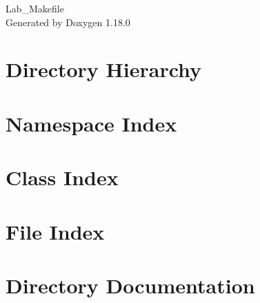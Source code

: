 \documentclass[twoside]{book}
\newcommand{\+}{\discretionary{\mbox{\scriptsize$\hookleftarrow$}}{}{}}
\newcommand{\clearemptydoublepage}{%
    \newpage{\pagestyle{empty}\cleardoublepage}%
  }
\begin{document}
  \raggedbottom
    \hypersetup{pageanchor=false,
                bookmarksnumbered=true,
                pdfencoding=unicode
               }
  \begin{titlepage}
  \vspace*{7cm}
  \begin{center}%
  {\Large Lab\+\_\+\+Makefile}\\
  \vspace*{1cm}
  {\large Generated by Doxygen 1.18.0}\\
  \end{center}
  \end{titlepage}
  \clearemptydoublepage
  \tableofcontents
  \clearemptydoublepage
  \hypersetup{pageanchor=true}
\chapter{Directory Hierarchy}

\chapter{Namespace Index}

\chapter{Class Index}

\chapter{File Index}

\chapter{Directory Documentation}
















\end{document}
